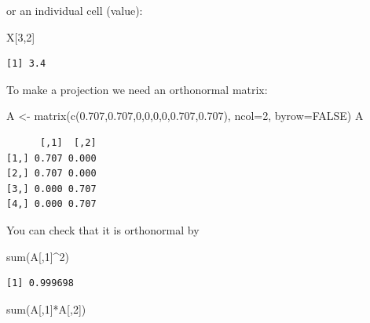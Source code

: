 \documentclass[
  letterpaper,
]{book}
\newenvironment{Shaded}{\begin{snugshade}}{\end{snugshade}}
\newcommand{\AttributeTok}[1]{\textcolor[rgb]{0.40,0.45,0.13}{#1}}
\newcommand{\ConstantTok}[1]{\textcolor[rgb]{0.56,0.35,0.01}{#1}}
\newcommand{\DecValTok}[1]{\textcolor[rgb]{0.68,0.00,0.00}{#1}}
\newcommand{\FloatTok}[1]{\textcolor[rgb]{0.68,0.00,0.00}{#1}}
\newcommand{\FunctionTok}[1]{\textcolor[rgb]{0.28,0.35,0.67}{#1}}
\newcommand{\NormalTok}[1]{\textcolor[rgb]{0.00,0.23,0.31}{#1}}
\newcommand{\OtherTok}[1]{\textcolor[rgb]{0.00,0.23,0.31}{#1}}
\newcommand{\SpecialCharTok}[1]{\textcolor[rgb]{0.37,0.37,0.37}{#1}}
\begin{document}
or an individual cell (value):

\begin{Shaded}
\begin{Highlighting}[]
\NormalTok{X[}\DecValTok{3}\NormalTok{,}\DecValTok{2}\NormalTok{]}
\end{Highlighting}
\end{Shaded}

\begin{verbatim}
[1] 3.4
\end{verbatim}

To make a projection we need an orthonormal matrix:

\begin{Shaded}
\begin{Highlighting}[]
\NormalTok{A }\OtherTok{\textless{}{-}} \FunctionTok{matrix}\NormalTok{(}\FunctionTok{c}\NormalTok{(}\FloatTok{0.707}\NormalTok{,}\FloatTok{0.707}\NormalTok{,}\DecValTok{0}\NormalTok{,}\DecValTok{0}\NormalTok{,}\DecValTok{0}\NormalTok{,}\DecValTok{0}\NormalTok{,}\FloatTok{0.707}\NormalTok{,}\FloatTok{0.707}\NormalTok{), }\AttributeTok{ncol=}\DecValTok{2}\NormalTok{, }\AttributeTok{byrow=}\ConstantTok{FALSE}\NormalTok{)}
\NormalTok{A}
\end{Highlighting}
\end{Shaded}

\begin{verbatim}
      [,1]  [,2]
[1,] 0.707 0.000
[2,] 0.707 0.000
[3,] 0.000 0.707
[4,] 0.000 0.707
\end{verbatim}

You can check that it is orthonormal by

\begin{Shaded}
\begin{Highlighting}[]
\FunctionTok{sum}\NormalTok{(A[,}\DecValTok{1}\NormalTok{]}\SpecialCharTok{\^{}}\DecValTok{2}\NormalTok{)}
\end{Highlighting}
\end{Shaded}

\begin{verbatim}
[1] 0.999698
\end{verbatim}

\begin{Shaded}
\begin{Highlighting}[]
\FunctionTok{sum}\NormalTok{(A[,}\DecValTok{1}\NormalTok{]}\SpecialCharTok{*}\NormalTok{A[,}\DecValTok{2}\NormalTok{])}
\end{Highlighting}
\end{Shaded}
\end{document}
